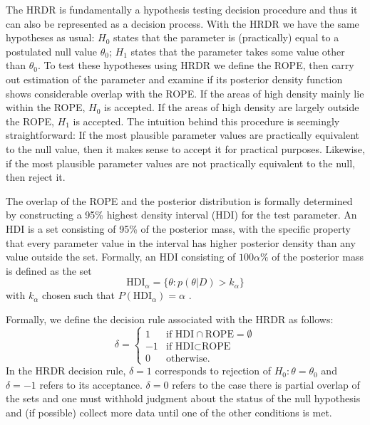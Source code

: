 \documentclass[9pt,twocolumn,twoside]{cidlab-draft}\templatetype{cidlab-invited}
\newcommand{\hdr}{HRDR}
\newcommand{\HDI}{\text{HDI}}
\begin{document}
The \hdr{} is fundamentally a hypothesis testing decision procedure and thus it can also be represented as a decision process. With the \hdr{} we have the same hypotheses as usual: $H_0$ states that the parameter is (practically) equal to a postulated null value $\theta_0$; $H_1$ states that the parameter takes some value other than $\theta_0$. To test these hypotheses using \hdr{} we define the ROPE, then carry out estimation of the parameter and examine if its posterior density function shows considerable overlap with the ROPE. If the areas of high density mainly lie within the ROPE, $H_0$ is accepted. If the areas of high density are largely outside the ROPE, $H_1$ is accepted. The intuition behind this procedure is seemingly straightforward: If the most plausible parameter values are practically equivalent to the null value, then it makes sense to accept it for practical purposes. Likewise, if the most plausible parameter values are not practically equivalent to the null, then reject it.

The overlap of the ROPE and the posterior distribution is formally determined by constructing a 95\% highest density interval (HDI) for the test parameter. An HDI is a set consisting of 95\% of the posterior mass, with the specific property that every parameter value in the interval has higher posterior density than any value outside the set. Formally, an HDI consisting of $100\alpha\%$ of the posterior mass is defined as the set  
\begin{equation}
    \HDI_\alpha = \{\theta:p(\theta|D)>k_\alpha\}\label{eq:hdi}
\end{equation}
with $k_\alpha$ chosen such that $P\!\left(\HDI_\alpha\right)=\alpha$ \cite{druilhet2007}. 

Formally, we define the decision rule associated with the \hdr{} as follows:
\begin{equation*}
    \delta =
    \begin{cases}
     1 & \text{if HDI} \cap \text{ROPE} = \emptyset \\
    -1 & \text{if HDI} \subset \text{ROPE}\\
     0 & \text{otherwise}.
    \end{cases}
\end{equation*}
In the \hdr{} decision rule, $\delta=1$ corresponds to rejection of $H_0:\theta=\theta_0$ and $\delta=-1$ refers to its acceptance. $\delta=0$ refers to the case there is partial overlap of the sets and one must withhold judgment about the status of the null hypothesis and (if possible) collect more data until one of the other conditions is met.
\end{document}
